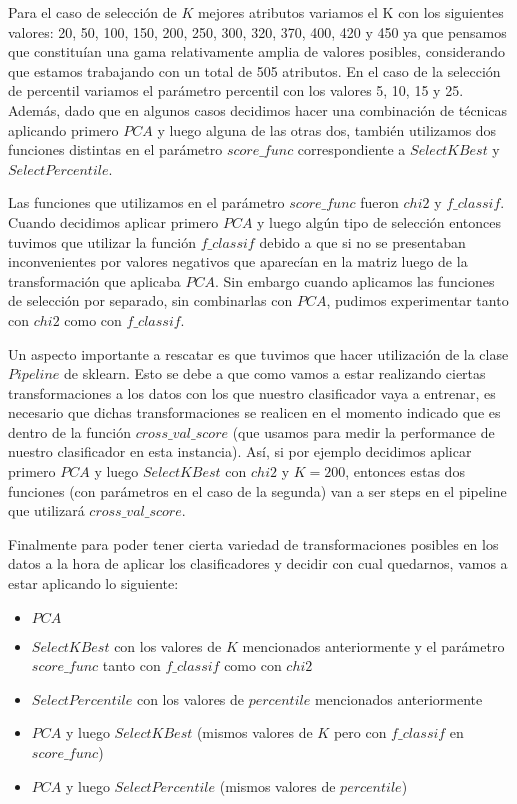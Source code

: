 \documentclass[a4paper]{article}
\begin{document}
Para el caso de selección de $K$ mejores atributos variamos el K con los siguientes valores: 20, 50, 100, 150, 200, 250, 300, 320, 370, 400, 420 y 450 ya que pensamos que constituían una gama relativamente amplia de valores posibles, considerando que estamos trabajando con un total de 505 atributos. En el caso de la selección de percentil variamos el parámetro percentil con los valores 5, 10, 15 y 25. Además, dado que en algunos casos decidimos hacer una combinación de técnicas aplicando primero $PCA$ y luego alguna de las otras dos, también utilizamos dos funciones distintas en el parámetro $score\_func$ correspondiente a $SelectKBest$ y $SelectPercentile$.

Las funciones que utilizamos en el parámetro $score\_func$ fueron $chi2$ y $f\_classif$. Cuando decidimos aplicar primero $PCA$ y luego algún tipo de selección entonces tuvimos que utilizar la función $f\_classif$ debido a que si no se presentaban inconvenientes por valores negativos que aparecían en la matriz luego de la transformación que aplicaba $PCA$. Sin embargo cuando aplicamos las funciones de selección por separado, sin combinarlas con $PCA$, pudimos experimentar tanto con $chi2$ como con $f\_classif$.

Un aspecto importante a rescatar es que tuvimos que hacer utilización de la clase $Pipeline$ de sklearn. Esto se debe a que como vamos a estar realizando ciertas transformaciones a los datos con los que nuestro clasificador vaya a entrenar, es necesario que dichas transformaciones se realicen en el momento indicado que es dentro de la función $cross\_val\_score$ (que usamos para medir la performance de nuestro clasificador en esta instancia). Así, si por ejemplo decidimos aplicar primero $PCA$ y luego $SelectKBest$ con $chi2$ y $K = 200$, entonces estas dos funciones (con parámetros en el caso de la segunda) van a ser steps en el pipeline que utilizará $cross\_val\_score$.

Finalmente para poder tener cierta variedad de transformaciones posibles en los datos a la hora de aplicar los clasificadores y decidir con cual quedarnos, vamos a estar aplicando lo siguiente:
\begin{itemize}
\item $PCA$
\item $SelectKBest$ con los valores de $K$ mencionados anteriormente y el parámetro $score\_func$ tanto con $f\_classif$ como con $chi2$
\item $SelectPercentile$ con los valores de $percentile$ mencionados anteriormente
\item $PCA$ y luego $SelectKBest$ (mismos valores de $K$ pero con $f\_classif$ en $score\_func$)
\item $PCA$ y luego $SelectPercentile$ (mismos valores de $percentile$)
\end{itemize}
\end{document}
